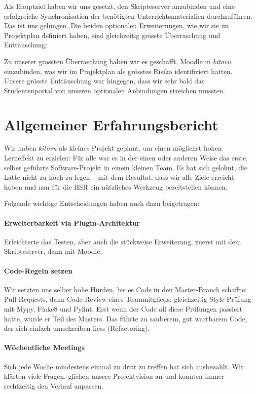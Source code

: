 \documentclass[a4paper]{article}
\let\oldsection\section
\renewcommand\section{\clearpage\oldsection}
\begin{document}
Als Hauptziel haben wir uns gesetzt, den Skripteserver anzubinden und eine erfolgreiche Synchronisation der benötigten Unterrichtsmaterialien durchzuführen. Das ist uns gelungen. Die beiden optionalen Erweiterungen, wie wir sie im Projektplan definiert haben, sind gleichzeitig grösste Überraschung und Enttäuschung:

Zu unserer grössten Überraschung haben wir es geschafft, Moodle in \emph{kitovu} einzubinden, was wir im Projektplan als grösstes Risiko identifiziert hatten. Unsere grösste Enttäuschung war hingegen, dass wir sehr bald das Studentenportal von unseren optionalen Anbindungen streichen mussten.

\section{Allgemeiner Erfahrungsbericht}

Wir haben \emph{kitovu} als kleines Projekt geplant, um einen möglichst hohen Lerneffekt zu erzielen: Für alle war es in der einen oder anderen Weise das erste, selber geführte Software-Projekt in einem kleinen Team. Es hat sich gelohnt, die Latte nicht zu hoch zu legen -- mit dem Resultat, dass wir alle Ziele erreicht haben und nun für die HSR ein nützliches Werkzeug bereitstellen können.

Folgende wichtige Entscheidungen haben auch dazu beigetragen:

\paragraph{Erweiterbarkeit via Plugin-Architektur}
 Erleichterte das Testen, aber auch die stückweise Erweiterung, zuerst mit dem Skripteserver, dann mit Moodle.

\paragraph{Code-Regeln setzen}
 Wir setzten uns selber hohe Hürden, bis es Code in den Master-Branch schaffte: Pull-Requests, dann Code-Review eines Teammitglieds; gleichzeitig  Style-Prüfung mit Mypy, Flake8 und Pylint. Erst wenn der Code all diese Prüfungen passiert hatte, wurde er Teil des Masters. Das führte zu sauberem, gut wartbarem Code, der sich einfach umschreiben liess (Refactoring).

\paragraph{Wöchentliche Meetings} Sich jede Woche mindestens einmal zu dritt zu treffen hat sich ausbezahlt. Wir klärten viele Fragen, glichen unsere Projektvision an und konnten immer rechtzeitig den Verlauf anpassen.
\end{document}
